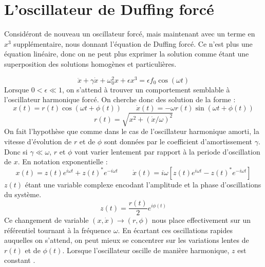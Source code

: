 \chapter{L'oscillateur de Duffing forcé}

Considéront de nouveau un oscillateur forcé, mais maintenant avec un terme en $x^3$ supplémentaire, nous donnant l'équation de Duffing forcé. Ce n'est plus une équation linéaire, donc on ne peut plus exprimer la solution comme étant une superposition des solutions homogènes et particulières.


\begin{equation}
    \ddot{x} + \gamma \dot{x} + \omega_0^2 x + \epsilon x^3 = \epsilon f_0 \cos(\omega t)
    \label{eq:duffing}
\end{equation}
%
Lorsque $0 < \epsilon \ll 1$, on s'attend à trouver un comportement semblable à l'oscillateur harmonique forcé. 
On cherche donc des solution de la forme :
\begin{equation}
x(t) = r(t)\cos(\omega t + \phi(t)) \qquad \dot{x}(t) =  -\omega r(t)\sin(\omega t + \phi(t))
\label{eq:duff_x_xdot}
\end{equation}
\begin{equation*}
    r(t) = \sqrt{x^2 + (\dot{x}/\omega)^2}
\end{equation*}
%
On fait l'hypothèse que comme dans le cas de l'oscillateur harmonique amorti, 
la vitesse d'évolution de $r$ et de $\phi$ sont données par le coefficient d'amortissement $\gamma$. 
Donc si $\gamma \ll \omega$,  $r$ et $\phi$ vont varier
 lentement par rapport à la periode d'oscillation de $x$.
%
En notation exponentielle :
\begin{equation}
    x(t) = z(t)e^{i\omega t} + z(t)^* e^{-i\omega t}
    \qquad 
    \dot{x}(t) = i\omega \left[ z(t)e^{i\omega t} - z(t)^* e^{-i\omega t} \right]
\end{equation}
%
$z(t)$ étant une variable complexe encodant l'amplitude et la phase d'oscillations du système.
\[ z(t) = \frac{r(t)}{2}e^{i\phi(t)} \]
%
Ce changement de variable $(x, \dot{x}) \to (r, \phi)$ nous place effectivement sur un référentiel tournant à la fréquence $\omega$. 
En écartant ces oscillations rapides auquelles on s'attend, on peut mieux se concentrer sur les variations lentes de $r(t)$ et de $\phi(t)$. 
Lorsque l'oscillateur oscille de manière harmonique, $z$ est constant \cite{pistolesi_duffing_nodate}.

